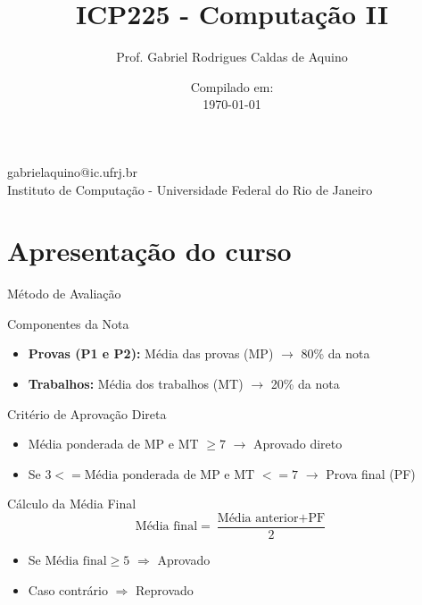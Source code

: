 \title{ICP225 - Computação II}

\author{Prof. Gabriel Rodrigues Caldas de Aquino}

\institute
{
  gabrielaquino@ic.ufrj.br\\

  Instituto de Computação -
  Universidade Federal do Rio de Janeiro %
}
\date{Compilado em: \\ \today} %


\section{Apresentação do curso}
\begin{frame}
  \titlepage
\end{frame}



\begin{frame}{Método de Avaliação}
  \begin{block}{Componentes da Nota}
    \begin{itemize}
      \item \textbf{Provas (P1 e P2):}
            Média das provas (MP) $\rightarrow$ 80\% da nota
      \item \textbf{Trabalhos:}
            Média dos trabalhos (MT) $\rightarrow$ 20\% da nota
    \end{itemize}
  \end{block}

  \begin{block}{Critério de Aprovação Direta}
    \begin{itemize}
      \item Média ponderada de MP e MT $\geq 7$
            \hspace{1em} $\rightarrow$ Aprovado direto
      \item Se $3 <= \text{Média ponderada de MP e MT } <= 7$
            \hspace{1em} $\rightarrow$ Prova final (PF)
    \end{itemize}
  \end{block}

  \begin{block}{Cálculo da Média Final}
    \[
      \text{Média final} = \frac{\text{Média anterior} + \text{PF}}{2}
    \]
    \begin{itemize}
      \item Se $\text{Média final} \geq 5$ $\Rightarrow$ Aprovado
      \item Caso contrário $\Rightarrow$ Reprovado
    \end{itemize}
  \end{block}
\end{frame}
